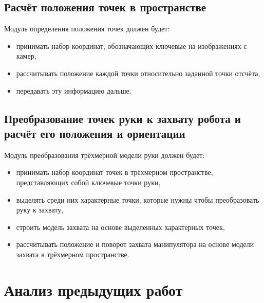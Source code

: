 \documentclass[14pt, a4paper]{extarticle}
\begin{document}
\subsection{Расчёт положения точек в пространстве}
Модуль определения положения точек должен будет:
\begin{itemize}
    \item принимать набор координат, обозначающих ключевые на изображениях с камер,
    \item рассчитывать положение каждой точки относительно заданной точки отсчёта,
    \item передавать эту информацию дальше.
\end{itemize}

\subsection{Преобразование точек руки к захвату робота и расчёт его положения и ориентации}
Модуль преобразования трёхмерной модели руки должен будет:
\begin{itemize}
    \item принимать набор координат точек в трёхмерном пространстве, представляющих собой ключевые точки руки,
    \item выделять среди них характерные точки, которые нужны чтобы преобразовать руку к захвату,
    \item строить модель захвата на основе выделенных характерных точек,
    \item рассчитывать положение и поворот захвата манипулятора на основе модели захвата в трёхмерном пространстве.
\end{itemize}


\section{Анализ предыдущих работ}
\end{document}
